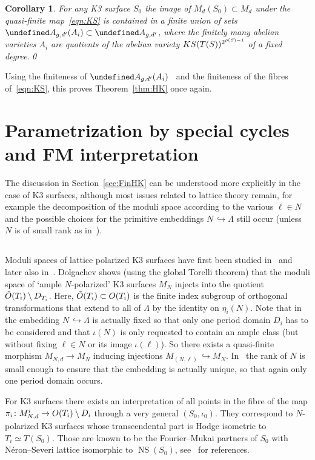 \documentclass[11pt]{article}
\newtheorem{coro}[theo]{Corollary}
\theoremstyle{definition}
\numberwithin{equation}{section}
\numberwithin{figure}{section}
\numberwithin{table}{section}
\let\cal\undefined
\DeclareMathOperator{\NS}{NS}
\newcommand{\OO}{{\rm O}}
\newcommand{\cal}{\mathcal}
\newcommand{\ka}{{\cal A}}
\renewcommand{\cong}{\simeq}
\begin{document}
\begin{coro}
For any K3 surface $S_0$ the image of $M_d(S_0)\subset M_d$ under the quasi-finite map~\eqref{eqn:KS} is contained in a finite union of sets $\ka_{g,d'}(A_i)\subset \ka_{g,d'}$, where the finitely many abelian varieties $A_i$ are quotients of the abelian variety ${\rm KS}(T(S))^{2^{\rho(S)-1}}$ of a fixed degree.\qed
\end{coro}

Using the finiteness of $\ka_{g,d'}(A_i)$~\cite{NarNor} and the finiteness of the fibres of~\eqref{eqn:KS}, this proves Theorem~\ref{thm:HK} once again.


\section{Parametrization by special cycles and FM interpretation}\label{sec:paraFM}

The discussion in Section~\ref{sec:FinHK} can be understood more explicitly in the case of K3 surfaces, although most issues related to lattice theory remain, for example the decomposition of the moduli space according to the various $\ell\in N$ and the possible choices for the primitive embeddings $N\,\hookrightarrow \Lambda$ still occur (unless $N$ is of small rank as in~\cite{Beauv}).

\subsection{}
Moduli spaces of lattice polarized K3 surfaces have first been studied in~\cite{Dolg} and later also in~\cite{Beauv}. Dolgachev shows (using the global Torelli theorem) that the moduli space of `ample $N$-polarized' K3 surfaces $M_N$ injects into the quotient $\tilde \OO(T_i)\setminus D_{T_i}$. Here, $\tilde\OO(T_i)\subset\OO(T_i)$ is the finite index subgroup of orthogonal transformations that extend to all of $\Lambda$ by the identity on $\eta_i(N)$. Note that in~\cite{Dolg} the embedding $N\,\hookrightarrow \Lambda$ is actually fixed so that only one period domain $D_i$ has to be considered and that $\iota(N)$ is only requested to contain an ample class (but without fixing $\ell\in N$ or its image $\iota(\ell)$). So there exists a quasi-finite morphism $M_{N,d}\to M_N$ inducing injections $M_{(N,\ell)}\,\hookrightarrow M_N$. In~\cite{Beauv} the rank of $N$ is small enough to ensure that the embedding is actually unique, so that again only one period domain occurs.

For K3 surfaces there exists an interpretation of all points in the fibre of the map $\pi_i\colon M^i_{N,d}\to \OO(T_i)\setminus D_i$ through a very general $(S_0,\iota_0)$. They correspond to $N$-polarized K3 surfaces whose transcendental part is Hodge isometric to $T_i\cong T(S_0)$. Those are known to be the Fourier--Mukai partners of $S_0$ with N\'eron--Severi lattice isomorphic to $\NS(S_0)$, see~\cite[Chapter~16]{HuyK3} for references.
\end{document}

